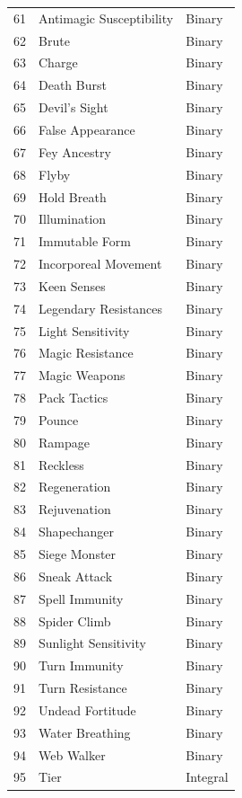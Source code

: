 \documentclass{article}
\begin{document}
\begin{table}[!htbp]
\begin{scriptsize}
\begin{minipage}[b]{0.45\linewidth}
\begin{longtable}{@{}rll@{}}
	61 & Antimagic Susceptibility & Binary \\
	62 & Brute & Binary \\
	63 & Charge & Binary \\
	64 & Death Burst & Binary \\
	65 & Devil's Sight & Binary \\
	66 & False Appearance & Binary \\
	67 & Fey Ancestry & Binary \\
	68 & Flyby & Binary \\
	69 & Hold Breath & Binary \\
	70 & Illumination & Binary \\
	71 & Immutable Form & Binary \\
	72 & Incorporeal Movement & Binary \\
	73 & Keen Senses & Binary \\
	74 & Legendary Resistances & Binary \\
	75 & Light Sensitivity & Binary \\
	76 & Magic Resistance & Binary \\
	77 & Magic Weapons & Binary \\
	78 & Pack Tactics & Binary \\
	79 & Pounce & Binary \\
	80 & Rampage & Binary \\
	81 & Reckless & Binary \\
	82 & Regeneration & Binary \\
	83 & Rejuvenation & Binary \\
	84 & Shapechanger & Binary \\
	85 & Siege Monster & Binary \\
	86 & Sneak Attack & Binary \\
	87 & Spell Immunity & Binary \\
	88 & Spider Climb & Binary \\
	89 & Sunlight Sensitivity & Binary \\
	90 & Turn Immunity & Binary \\
	91 & Turn Resistance & Binary \\
	92 & Undead Fortitude & Binary \\
	93 & Water Breathing & Binary \\
	94 & Web Walker & Binary \\
	95 & Tier & Integral \\
	\bottomrule
\end{longtable}
\end{minipage}
\end{scriptsize}

\end{table}
\end{document}

